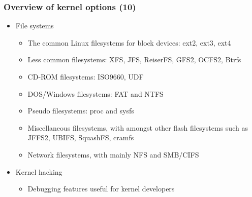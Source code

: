 \begin{frame}
  \frametitle{Overview of kernel options (10)}
  \begin{itemize}
  \item File systems
    \begin{itemize}
    \item The common Linux filesystems for block devices: ext2, ext3,
      ext4
    \item Less common filesystems: XFS, JFS, ReiserFS, GFS2, OCFS2,
      Btrfs
    \item CD-ROM filesystems: ISO9660, UDF
    \item DOS/Windows filesystems: FAT and NTFS
    \item Pseudo filesystems: proc and sysfs
    \item Miscellaneous filesystems, with amongst other flash
      filesystems such as JFFS2, UBIFS, SquashFS, cramfs
    \item Network filesystems, with mainly NFS and SMB/CIFS
    \end{itemize}
  \item Kernel hacking
    \begin{itemize}
    \item Debugging features useful for kernel developers
    \end{itemize}
  \end{itemize}
\end{frame}
